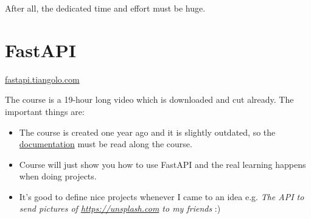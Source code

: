 		    After all, \textsf{the dedicated time and effort must be huge.}
		
		\clearpage
		\section{FastAPI}
			\epigraph{
				\begin{sansserif}
				\end{sansserif}	
			}{\href{https://fastapi.tiangolo.com}{fastapi.tiangolo.com}}
			
			
			\noindent The course is a 19-hour long video which is downloaded and cut already. The important things are:
			\begin{itemize}
				\item The course is created one year ago and it is slightly outdated, so the \href{https://fastapi.tiangolo.com}{documentation} must be read along the course.
				
				\item Course will just show you how to use FastAPI and the real learning happens when doing projects.
				
				\item It's good to define nice projects whenever I came to an idea
				e.g. \textit{The API to send pictures of \url{https://unsplash.com} to my friends} :)
			\end{itemize}

